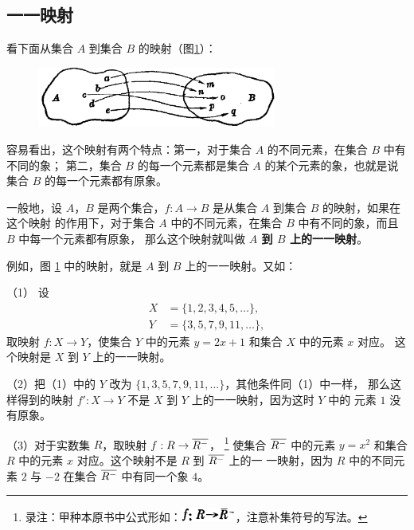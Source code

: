 \subsection{一一映射}\label{subsec:1-8}

看下面从集合 $A$ 到集合 $B$ 的映射（图\ref{fig:1-23}）：

\begin{figure}[htbp]
    \centering
    \includegraphics[width=0.7\textwidth]{../pic/1-23}
    \caption{}\label{fig:1-23}
\end{figure}

容易看出，这个映射有两个特点：第一，对于集合 $A$ 的不同元素，在集合 $B$ 中有不同的象；
第二，集合 $B$ 的每一个元素都是集合 $A$ 的某个元素的象，也就是说集合 $B$ 的每一个元素都有原象。

一般地，设 $A$，$B$ 是两个集合，$f: A \to B$ 是从集合 $A$ 到集合 $B$ 的映射，如果在这个映射
的作用下，对于集合 $A$ 中的不同元素，在集合 $B$ 中有不同的象，而且 $B$ 中每一个元素都有原象，
那么这个映射就叫做 \textbf{$A$ 到 $B$ 上的一一映射}。

例如，图 \ref{fig:1-23} 中的映射，就是 $A$ 到 $B$ 上的一一映射。又如：

（1） 设
\begin{align*}
    X &= \{1, 2, 3, 4, 5, \dots \},\\
    Y &= \{3, 5, 7, 9, 11, \dots \},
\end{align*}
取映射 $f: X \to Y$，使集合 $Y$ 中的元素 $y = 2x + 1$ 和集合 $X$ 中的元素 $x$ 对应。
这个映射是 $X$ 到 $Y$ 上的一一映射。

（2）把（1）中的 $Y$ 改为 $\{1, 3, 5, 7, 9, 11, \dots \}$，其他条件同（1）中一样，
那么这样得到的映射 $f': X \to Y$ 不是 $X$ 到 $Y$ 上的一一映射，因为这时 $Y$ 中的
元素 $1$ 没有原象。

（3）对于实数集 $R$，取映射 $f: R \to \overline{R^-}$，
\footnote{录注：甲种本原书中公式形如：\includegraphics[width=1.8cm]{../pic/ch-1-8-1}，注意补集符号的写法。}
使集合 $\overline{R^-}$ 中的元素 $y = x^2$ 和集合 $R$ 中的元素 $x$ 对应。这个映射不是 $R$ 到 $\overline{R^-}$ 上的一
一映射，因为 $R$ 中的不同元素 $2$ 与 $-2$ 在集合 $\overline{R^-}$ 中有同一个象 $4$。

